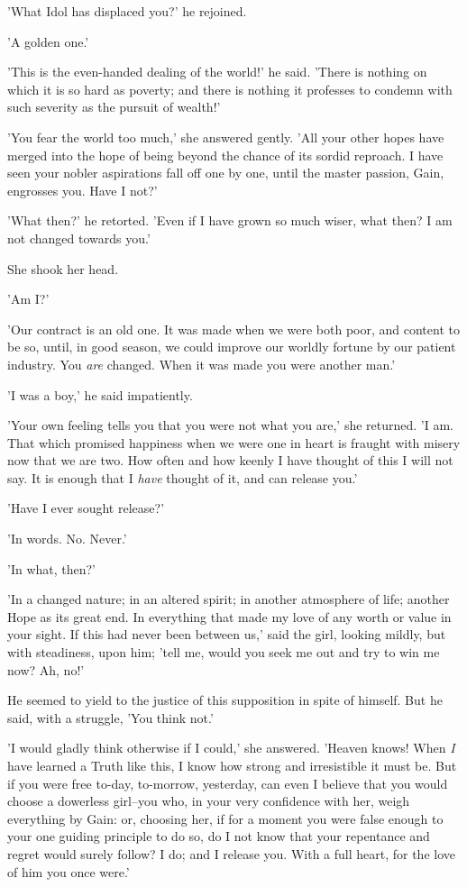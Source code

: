 'What Idol has displaced you?' he rejoined.

'A golden one.'

'This is the even-handed dealing of the world!' he said. 'There is
nothing on which it is so hard as poverty; and there is nothing it
professes to condemn with such severity as the pursuit of wealth!'

'You fear the world too much,' she answered gently. 'All your other
hopes have merged into the hope of being beyond the chance of its sordid
reproach. I have seen your nobler aspirations fall off one by one, until
the master passion, Gain, engrosses you. Have I not?'

'What then?' he retorted. 'Even if I have grown so much wiser, what
then? I am not changed towards you.'

She shook her head.

'Am I?'

'Our contract is an old one. It was made when we were both poor, and
content to be so, until, in good season, we could improve our worldly
fortune by our patient industry. You \emph{are} changed. When it was made you
were another man.'

'I was a boy,' he said impatiently.

'Your own feeling tells you that you were not what you are,' she
returned. 'I am. That which promised happiness when we were one in heart
is fraught with misery now that we are two. How often and how keenly I
have thought of this I will not say. It is enough that I \emph{have} thought
of it, and can release you.'

'Have I ever sought release?'

'In words. No. Never.'

'In what, then?'

'In a changed nature; in an altered spirit; in another atmosphere of
life; another Hope as its great end. In everything that made my love of
any worth or value in your sight. If this had never been between us,'
said the girl, looking mildly, but with steadiness, upon him; 'tell me,
would you seek me out and try to win me now? Ah, no!'

He seemed to yield to the justice of this supposition in spite of
himself. But he said, with a struggle, 'You think not.'

'I would gladly think otherwise if I could,' she answered. 'Heaven
knows! When \emph{I} have learned a Truth like this, I know how strong and
irresistible it must be. But if you were free to-day, to-morrow,
yesterday, can even I believe that you would choose a dowerless
girl--you who, in your very confidence with her, weigh everything by
Gain: or, choosing her, if for a moment you were false enough to your
one guiding principle to do so, do I not know that your repentance and
regret would surely follow? I do; and I release you. With a full heart,
for the love of him you once were.'


